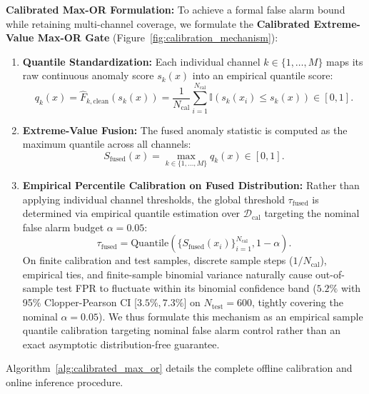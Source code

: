 \documentclass[preprint,12pt]{elsarticle}
\begin{document}
\textbf{Calibrated Max-OR Formulation:} To achieve a formal false alarm bound while retaining multi-channel coverage, we formulate the \textbf{Calibrated Extreme-Value Max-OR Gate} (Figure~\ref{fig:calibration_mechanism}):
\begin{enumerate}
    \item \textbf{Quantile Standardization:} Each individual channel $k \in \{1, \dots, M\}$ maps its raw continuous anomaly score $s_k(x)$ into an empirical quantile score:
    \begin{equation}
        q_k(x) = \hat{F}_{k, \mathrm{clean}}(s_k(x)) = \frac{1}{N_{\mathrm{cal}}} \sum_{i=1}^{N_{\mathrm{cal}}} \mathbb{I}\left( s_k(x_i) \le s_k(x) \right) \in [0, 1].
    \end{equation}
    \item \textbf{Extreme-Value Fusion:} The fused anomaly statistic is computed as the maximum quantile across all channels:
    \begin{equation}
        S_{\mathrm{fused}}(x) = \max_{k \in \{1, \dots, M\}} q_k(x) \in [0, 1].
    \end{equation}
    \item \textbf{Empirical Percentile Calibration on Fused Distribution:} Rather than applying individual channel thresholds, the global threshold $\tau_{\mathrm{fused}}$ is determined via empirical quantile estimation over $\mathcal{D}_{\mathrm{cal}}$ targeting the nominal false alarm budget $\alpha = 0.05$:
    \begin{equation}
        \tau_{\mathrm{fused}} = \mathrm{Quantile}\left( \{ S_{\mathrm{fused}}(x_i) \}_{i=1}^{N_{\mathrm{cal}}}, 1 - \alpha \right).
    \end{equation}
    On finite calibration and test samples, discrete sample steps ($1/N_{\mathrm{cal}}$), empirical ties, and finite-sample binomial variance naturally cause out-of-sample test FPR to fluctuate within its binomial confidence band ($5.2\%$ with 95\% Clopper-Pearson CI [$3.5\%, 7.3\%$] on $N_{\mathrm{test}}=600$, tightly covering the nominal $\alpha = 0.05$). We thus formulate this mechanism as an empirical sample quantile calibration targeting nominal false alarm control rather than an exact asymptotic distribution-free guarantee.
\end{enumerate}

Algorithm~\ref{alg:calibrated_max_or} details the complete offline calibration and online inference procedure.
\end{document}
